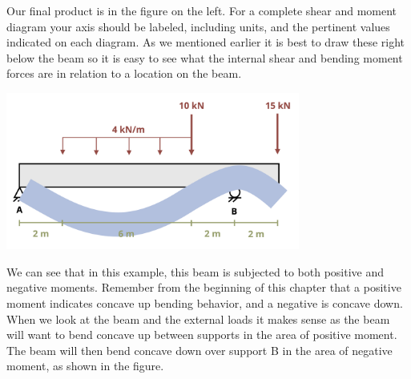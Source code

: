 \documentclass[
  letterpaper,
  DIV=11,
  numbers=noendperiod]{scrreprt}
\begin{document}
\begin{tcolorbox}
\begin{tcolorbox}
Our final product is in the figure on the left. For a complete shear and
moment diagram your axis should be labeled, including units, and the
pertinent values indicated on each diagram. As we mentioned earlier it
is best to draw these right below the beam so it is easy to see what the
internal shear and bending moment forces are in relation to a location
on the beam.

\begin{center}
\includegraphics[width=3.80208in,height=\textheight]{images/CH7 PNGs/example 7.3 part 14.png}
\end{center}

We can see that in this example, this beam is subjected to both positive
and negative moments. Remember from the beginning of this chapter that a
positive moment indicates concave up bending behavior, and a negative is
concave down. When we look at the beam and the external loads it makes
sense as the beam will want to bend concave up between supports in the
area of positive moment. The beam will then bend concave down over
support B in the area of negative moment, as shown in the figure.

\end{tcolorbox}

\end{tcolorbox}
\end{document}
